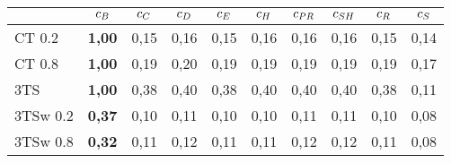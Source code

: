 \begin{tabular}[ht]{l|c|c|c|c|c|c|c|c|c}
\hline
\hline
	& $c_{B}$	& $c_{C}$	& $c_{D}$	& $c_{E}$ & $c_{H}$	& $c_{PR}$ & $c_{SH}$ & $c_{R}$ & $c_{S}$\\
\hline
CT 0.2		 & \textbf{1,00} & 0,15 & 0,16 & 0,15 & 0,16 & 0,16 & 0,16 & 0,15 & 0,14\\
CT 0.8		 & \textbf{1,00} & 0,19 & 0,20 & 0,19 & 0,19 & 0,19 & 0,19 & 0,19 & 0,17\\
3TS		 	 & \textbf{1,00} & 0,38 & 0,40 & 0,38 & 0,40 & 0,40 & 0,40 & 0,38 & 0,11\\
3TSw 0.2	 & \textbf{0,37} & 0,10 & 0,11 & 0,10 & 0,10 & 0,11 & 0,11 & 0,10 & 0,08\\
3TSw 0.8	 & \textbf{0,32} & 0,11 & 0,12 & 0,11 & 0,11 & 0,12 & 0,12 & 0,11 & 0,08\\
\hline
\hline
\end{tabular}
